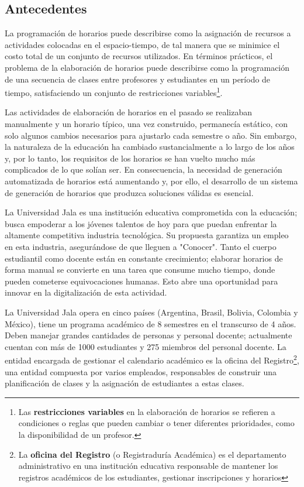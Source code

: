 \subsection{Antecedentes}
La programación de horarios puede describirse como la asignación de recursos a actividades colocadas en el espacio-tiempo, de tal manera que se minimice el costo total de un conjunto de recursos utilizados.
En términos prácticos, el problema de la elaboración de horarios puede describirse como la programación de una secuencia de clases entre profesores y estudiantes en un período de tiempo, satisfaciendo un conjunto de restricciones variables\footnote{Las \textbf{restricciones variables} en la elaboración de horarios se refieren a condiciones o reglas que pueden cambiar o tener diferentes prioridades, como la disponibilidad de un profesor.}.

Las actividades de elaboración de horarios en el pasado se realizaban manualmente y un horario típico, una vez construido, permanecía estático, con solo algunos cambios necesarios para ajustarlo cada semestre o año.
Sin embargo, la naturaleza de la educación ha cambiado sustancialmente a lo largo de los años y, por lo tanto, los requisitos de los horarios se han vuelto mucho más complicados de lo que solían ser. 
En consecuencia, la necesidad de generación automatizada de horarios está aumentando y, por ello, el desarrollo de un sistema de generación de horarios que produzca soluciones válidas es esencial.

La Universidad Jala es una institución educativa comprometida con la educación; busca empoderar a los jóvenes talentos de hoy para que puedan enfrentar la altamente competitiva industria tecnológica. 
Su propuesta garantiza un empleo en esta industria, asegurándose de que lleguen a "Conocer".
Tanto el cuerpo estudiantil como docente están en constante crecimiento; elaborar horarios de forma manual se convierte en una tarea que consume mucho tiempo, donde pueden cometerse equivocaciones humanas.
Esto abre una oportunidad para innovar en la digitalización de esta actividad.

La Universidad Jala opera en cinco países (Argentina, Brasil, Bolivia, Colombia y México), tiene un programa académico de 8 semestres en el transcurso de 4 años.
Deben manejar grandes cantidades de personas y personal docente; actualmente cuentan con más de 1000 estudiantes y 275 miembros del personal docente.
La entidad encargada de gestionar el calendario académico es la oficina del Registro\footnote{La \textbf{oficina del Registro} (o Registraduría Académica) es el departamento administrativo en una institución educativa responsable de mantener los registros académicos de los estudiantes, gestionar inscripciones y horarios}, una entidad compuesta por varios empleados, responsables de construir una planificación de clases y la asignación de estudiantes a estas clases.

